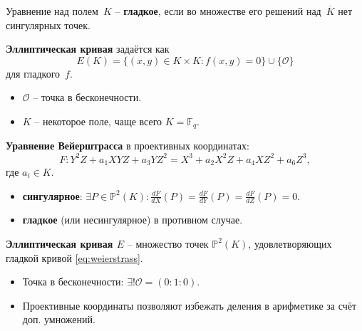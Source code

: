 \documentclass[11pt]{exam}
\theoremstyle{definition}
\begin{document}
{Уравнение над полем~$K$ -- \textbf{гладкое}, если во множестве его решений над~$\overline{K}$ нет сингулярных точек.
\vspace{1em}

\textbf{Эллиптическая кривая} задаётся как \[E(K) = \{ (x,y) \in K \times K: f(x,y)=0 \} \cup \{\mathcal{O}\}
\]
для гладкого~$f$.
\begin{itemize}
	\item $\mathcal{O}$ -- точка в бесконечности.
	\item $K$ -- некоторое поле, чаще всего $K = \mathbb{F}_q$.
\end{itemize}

\textbf{Уравнение Вейерштрасса} в проективных координатах: 
\begin{equation}
	\label{eq:weierstrass}
	F: Y^2Z + a_1 X Y Z + a_3 Y Z^2 = X^3 + a_2 X^2 Z + a_4 X Z^2 + a_6 Z^3,
\end{equation}
где $a_i \in K$.
\begin{itemize}
	\item \textbf{сингулярное}: $\exists P \in \mathbb{P}^2(K): \frac{dF}{dX}(P) = \frac{dF}{dY}(P) = \frac{dF}{dZ}(P) = 0$.
	\item  \textbf{гладкое} (или несингулярное) в противном случае.
\end{itemize}

\vspace{1em}

\textbf{Эллиптическая кривая $E$} -- множество точек $\mathbb{P}^2(K)$, удовлетворяющих гладкой кривой \eqref{eq:weierstrass}.

\begin{itemize}
	\item Точка в бесконечности: $\exists! \mathcal{O} = (0: 1: 0)$.
\end{itemize}

\begin{itemize}
	\item Проективные координаты позволяют избежать деления в арифметике за счёт доп. умножений.
\end{itemize}

}
\end{document}
